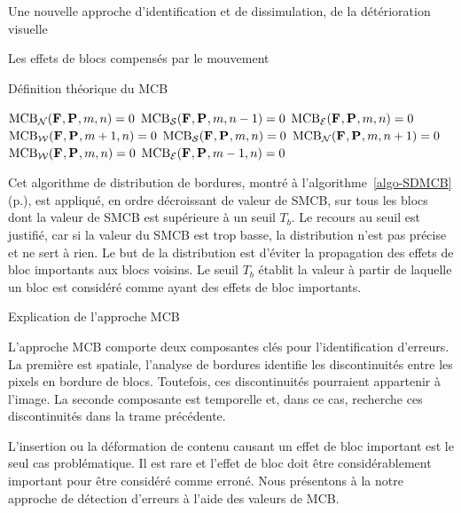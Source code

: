 \begin{chapter}{Une nouvelle approche d'identification et de dissimulation, de
la détérioration visuelle}
\begin{section}{Les effets de blocs compensés par le mouvement}
\begin{subsection}{Définition théorique du MCB}
\begin{algorithm}
\caption{Distribution de bordures}
\label{algo-SDMCB}
\begin{algorithmic}[1]
\STATE {}
\STATE $\textrm{MCB}_{\mathcal{N}}(\mathbf{F}_{},\mathbf{P}_{}, m,n) = 0$ \ELSE \STATE
$\textrm{MCB}_{\mathcal{S}}(\mathbf{F}_{},\mathbf{P}_{},m,n-1) = 0$ \ENDIF \STATE \STATE
{}
\STATE $\textrm{MCB}_{\mathcal{E}}(\mathbf{F}_{},\mathbf{P}_{},m,n) = 0$ \ELSE \STATE
$\textrm{MCB}_{\mathcal{W}}(\mathbf{F}_{},\mathbf{P}_{},m+1,n) = 0$ \ENDIF \STATE \STATE
{}
\STATE $\textrm{MCB}_{\mathcal{S}}(\mathbf{F}_{},\mathbf{P}_{},m,n) = 0$ \ELSE \STATE
$\textrm{MCB}_{\mathcal{N}}(\mathbf{F}_{},\mathbf{P}_{},m,n+1) = 0$ \ENDIF \STATE \STATE
{}
\STATE $\textrm{MCB}_{\mathcal{W}}(\mathbf{F}_{},\mathbf{P}_{},m,n) = 0$ \ELSE \STATE
$\textrm{MCB}_{\mathcal{E}}(\mathbf{F}_{},\mathbf{P}_{},m-1,n) = 0$ \ENDIF
\end{algorithmic}
\end{algorithm}
 
Cet algorithme de distribution de bordures, montré à
l'algorithme~\ref{algo-SDMCB} (p.\pageref{algo-SDMCB}), est appliqué, en ordre
décroissant de valeur de SMCB, sur tous les blocs dont la valeur de SMCB est
supérieure à un seuil $T_b$. Le recours au seuil est justifié, car si la valeur
du SMCB est trop basse, la distribution n'est pas précise et ne sert à rien. Le
but de la distribution est d'éviter la propagation des effets de bloc importants
aux blocs voisins. Le seuil $T_b$ établit la valeur à partir de laquelle un bloc
est considéré comme ayant des effets de bloc importants. \FloatBarrier
\end{subsection}

\begin{subsection}{Explication de l'approche MCB}
\label{subsect-ExplicationMCB}

L'approche MCB comporte deux composantes clés pour l'identification d'erreurs.
La première est spatiale, l'analyse de bordures identifie les discontinuités
entre les pixels en bordure de blocs. Toutefois, ces discontinuités pourraient
appartenir à l'image. La seconde composante est temporelle et, dans ce cas,
recherche ces discontinuités dans la trame précédente.

L'insertion ou la déformation de contenu causant un effet de bloc important est
le seul cas problématique. Il est rare et l'effet de bloc doit être
considérablement important pour être considéré comme erroné. Nous présentons à
la  notre approche de détection d'erreurs à l'aide des
valeurs de MCB.


\end{subsection}
\end{section}
\end{chapter}
